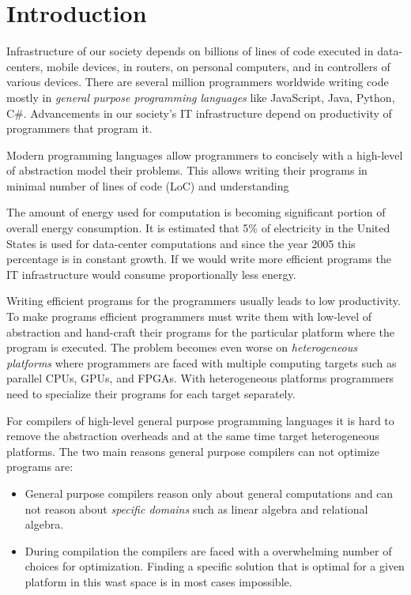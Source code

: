 \chapter{Introduction}
\label{sct:introduction}

Infrastructure of our society depends on billions of lines of code executed in data-centers,
 mobile devices, in routers, on personal computers, and in controllers of various devices. There are
 several million programmers worldwide writing code mostly in \emph{general purpose programming languages}
 like JavaScript, Java, Python, C\#. Advancements in our society's IT infrastructure depend on
 productivity of programmers that program it.

Modern programming languages allow programmers to concisely with a high-level of
 abstraction model their problems. This allows writing their programs in minimal
 number of lines of code (LoC) and understanding

The amount of energy used for computation is becoming significant portion of overall energy consumption. It is estimated
 that 5\%  of electricity in the United States is used for data-center computations and since
 the year 2005 this percentage is in constant growth. If we would write more efficient
 programs the IT infrastructure would consume proportionally less energy.

Writing efficient programs for the programmers usually leads to low productivity. To make programs
 efficient programmers must write them with low-level of abstraction and hand-craft their
 programs for the particular platform where the program is executed. The problem
 becomes even worse on \emph{heterogeneous platforms} where programmers are faced
 with multiple computing targets such as parallel CPUs, GPUs, and FPGAs. With heterogeneous
 platforms programmers need to specialize their programs for each target separately.

For compilers of high-level general purpose programming languages it is hard to remove
 the abstraction overheads and at the same time target heterogeneous platforms. The two main
 reasons general purpose compilers can not optimize programs are:\begin{itemize}
 \item General purpose compilers reason only about general computations and can not reason
   about \emph{specific domains} such as linear algebra and relational algebra.
 \item During compilation the compilers are faced with a overwhelming number of choices
   for optimization. Finding a specific solution that is optimal for a given platform in
   this wast space is in most cases impossible.
 \end{itemize}


